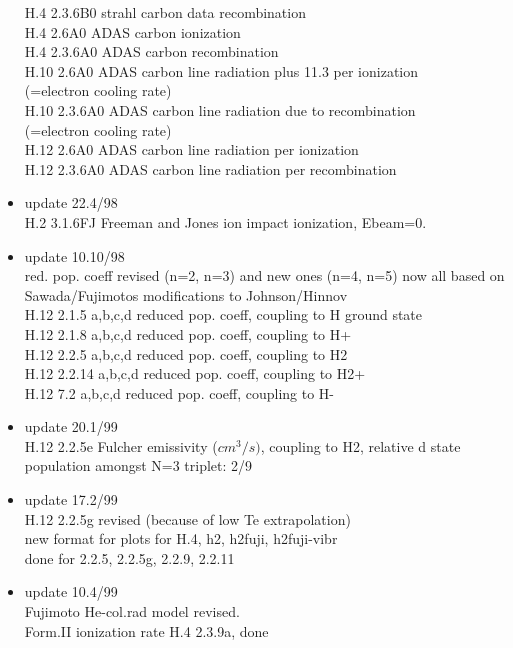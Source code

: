 \documentclass[12pt,dvipdfmx]{article}
\begin{document}
\begin{itemize}
  H.4 2.3.6B0 strahl carbon data recombination \\
  H.4 2.6A0 ADAS  carbon ionization    \\
  H.4 2.3.6A0 ADAS  carbon recombination \\
  H.10 2.6A0 ADAS  carbon line radiation plus 11.3 per ionization\\
                   (=electron cooling rate)\\
  H.10 2.3.6A0 ADAS  carbon line radiation due to recombination\\
                   (=electron cooling rate)\\
  H.12 2.6A0 ADAS  carbon line radiation per ionization\\
  H.12 2.3.6A0 ADAS  carbon line radiation per recombination
 \item update   22.4/98 \\
  H.2  3.1.6FJ  Freeman and Jones ion impact ionization, Ebeam=0.
 \item update   10.10/98 \\
  red. pop. coeff revised (n=2, n=3) and new ones (n=4, n=5)
  now all based on Sawada/Fujimotos modifications to Johnson/Hinnov\\
  H.12 2.1.5  a,b,c,d  reduced pop. coeff, coupling to H ground state\\
  H.12 2.1.8  a,b,c,d  reduced pop. coeff, coupling to H+\\
  H.12 2.2.5  a,b,c,d  reduced pop. coeff, coupling to H2\\
  H.12 2.2.14 a,b,c,d  reduced pop. coeff, coupling to H2+\\
  H.12 7.2    a,b,c,d  reduced pop. coeff, coupling to H-\\
 \item update   20.1/99 \\
  H.12 2.2.5e Fulcher emissivity ($cm^3/s)$, coupling to H2,
  relative d state population amongst N=3 triplet: 2/9\\
 \item update   17.2/99 \\
  H.12 2.2.5g revised (because of low Te extrapolation)\\
  new format for plots for H.4,  h2, h2fuji, h2fuji-vibr \\
  done for 2.2.5, 2.2.5g, 2.2.9, 2.2.11
 \item update   10.4/99 \\
  Fujimoto He-col.rad model revised.\\
  Form.II      ionization rate          H.4  2.3.9a, done \\

\end{itemize}
\end{document}
